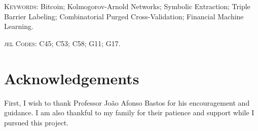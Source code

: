 \documentclass[12pt,a4paper,oneside]{article}
\begin{document}
\vspace{1em}

\textsc{Keywords}: Bitcoin; Kolmogorov-Arnold Networks; Symbolic Extraction; Triple Barrier Labeling; Combinatorial Purged Cross-Validation; Financial Machine Learning.

\vspace{1em}

\textsc{\gls{jel} Codes}: C45; C53; C58; G11; G17.


\newpage
\thispagestyle{plain}
\renewcommand*\contentsname{\hfill\normalfont\scshape\normalsize Table of Contents \hfill}
\tableofcontents

\newpage
\thispagestyle{plain}
\renewcommand*\listfigurename{\hfill\normalfont\scshape\normalsize List of Figures \hfill}
\listoffigures

\newpage
\thispagestyle{plain}
\renewcommand*\listtablename{\hfill\normalfont\scshape\normalsize List of Tables \hfill}
\listoftables



\newpage
\thispagestyle{plain}
\section*{Acknowledgements}

First, I wish to thank Professor João Afonso Bastos for his encouragement and guidance. I am also thankful to my family for their patience and support while I pursued this project.


\newpage
\thispagestyle{plain}

\setcounter{page}{1}
\end{document}
